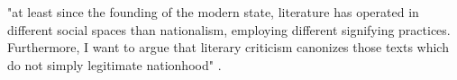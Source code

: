 "at least since the founding of the modern state, literature has operated in different social spaces than nationalism, employing different signifying practices. Furthermore, I want to argue that literary criticism canonizes those texts which do not simply legitimate nationhood" \cite[138]{During1990}.


